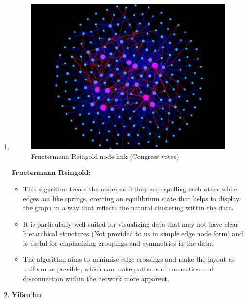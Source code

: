 \documentclass[conference]{IEEEtran}
\begin{document}
\begin{enumerate}
\begin{enumerate}
    \item 
    \begin{figure}
        \centering
        \includegraphics[width=1\linewidth]{Fruchter_NodeLink.png}
        \caption{Fructermann Reingold node link (Congress votes)}
        \label{fig:enter-label}
    \end{figure}
    \textbf{Fructermann Reingold: }
    \begin{itemize}
         \item This algorithm treats the nodes as if they are repelling each other while edges act like springs, creating an equilibrium state that helps to display the graph in a way that reflects the natural clustering within the data.
         \item It is particularly well-suited for visualizing data that may not have clear hierarchical structures (Not provided to us in simple edge node form) and is useful for emphasizing groupings and symmetries in the data.
         \item The algorithm aims to minimize edge crossings and make the layout as uniform as possible, which can make patterns of connection and disconnection within the network more apparent.
    \end{itemize}
    

    \item \textbf{Yifan hu}


\end{enumerate}
\end{enumerate}
\end{document}
